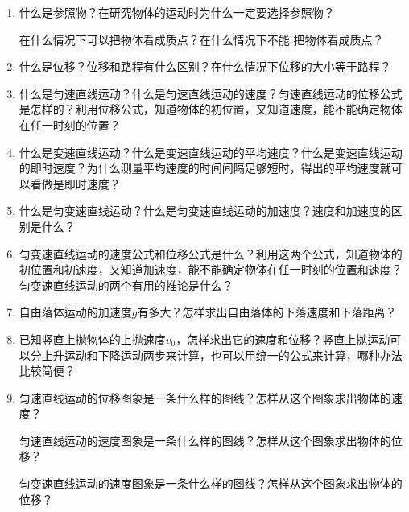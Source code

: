 \begin{enumerate}
\item 什么是参照物？在研究物体的运动时为什么一定要选择参照物？

在什么情况下可以把物体看成质点？在什么情况下不能
把物体看成质点？
\item 什么是位移？位移和路程有什么区别？在什么情况下位移的大小等于路程？
\item 什么是匀速直线运动？什么是匀速直线运动的速度？匀速直线运动的位移公式是怎样的？利用位移公式，知道物体的初位置，又知道速度，能不能确定物体在任一时刻的位置？
\item 什么是变速直线运动？什么是变速直线运动的平均速度？什么是变速直线运动的即时速度？为什么测量平均速度的时间间隔足够短时，得出的平均速度就可以看做是即时速度？
\item 什么是匀变速直线运动？什么是匀变速直线运动的加速度？速度和加速度的区别是什么？
\item 匀变速直线运动的速度公式和位移公式是什么？利用这两个公式，知道物体的初位置和初速度，又知道加速度，能不能确定物体在任一时刻的位置和速度？
匀变速直线运动的两个有用的推论是什么？
\item 自由落体运动的加速度$g$有多大？怎样求出自由落体的下落速度和下落距离？
\item 已知竖直上抛物体的上抛速度$v_0$，怎样求出它的速度和位移？竖直上抛运动可以分上升运动和下降运动两步来计算，也可以用统一的公式来计算，哪种办法比较简便？
\item 匀速直线运动的位移图象是一条什么样的图线？怎样从这个图象求出物体的速度？

匀速直线运动的速度图象是一条什么样的图线？怎样从这个图象求出物体的位移？

匀变速直线运动的速度图象是一条什么样的图线？怎样从这个图象求出物体的位移？

\end{enumerate}


